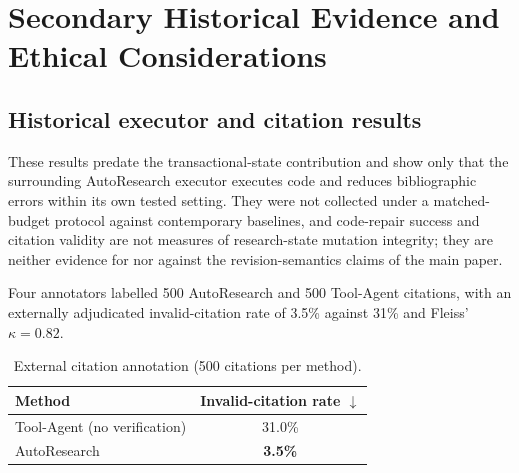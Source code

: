 \documentclass[journal]{IEEEtran}
\begin{document}
\section{Secondary Historical Evidence and Ethical Considerations}
\subsection{Historical executor and citation results}
These results predate the transactional-state contribution and show only that the surrounding AutoResearch executor executes code and reduces bibliographic errors within its own tested setting. They were not collected under a matched-budget protocol against contemporary baselines, and code-repair success and citation validity are not measures of research-state mutation integrity; they are neither evidence for nor against the revision-semantics claims of the main paper.

\begin{table}[!t]
\centering
\caption{Controlled code-repair results from the existing executor evaluation.}
\label{tab:executor_controlled}
\end{table}

Four annotators labelled 500 AutoResearch and 500 Tool-Agent citations, with an externally adjudicated invalid-citation rate of 3.5\% against 31\% and Fleiss' $\kappa=0.82$.

\begin{table}[!t]
\centering
\caption{External citation annotation (500 citations per method).}
\label{tab:citation_external}
\begin{tabular}{lc}
\toprule
Method & Invalid-citation rate $\downarrow$ \\
\midrule
Tool-Agent (no verification) & 31.0\% \\
AutoResearch & \textbf{3.5\%} \\
\bottomrule
\end{tabular}
\end{table}
\end{document}
